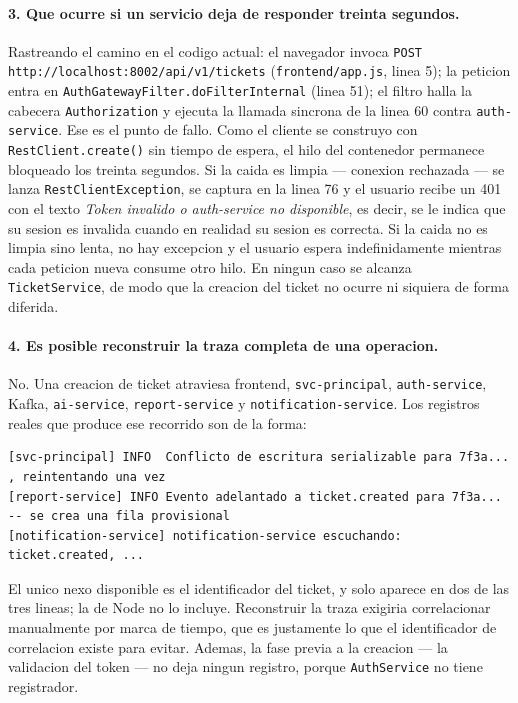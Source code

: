 \documentclass[10pt,a4paper]{article}
\begin{document}
\paragraph{3. Que ocurre si un servicio deja de responder treinta segundos.}
Rastreando el camino en el codigo actual: el navegador invoca
\texttt{POST http://localhost:8002/api/v1/tickets} (\texttt{frontend/app.js}, linea 5); la
peticion entra en \texttt{AuthGatewayFilter.doFilterInternal} (linea 51); el filtro halla la
cabecera \texttt{Authorization} y ejecuta la llamada sincrona de la linea 60 contra
\texttt{auth-service}. Ese es el punto de fallo. Como el cliente se construyo con
\texttt{RestClient.create()} sin tiempo de espera, el hilo del contenedor permanece
bloqueado los treinta segundos. Si la caida es limpia --- conexion rechazada --- se lanza
\texttt{RestClientException}, se captura en la linea 76 y el usuario recibe un 401 con el
texto \emph{Token invalido o auth-service no disponible}, es decir, se le indica que su
sesion es invalida cuando en realidad su sesion es correcta. Si la caida no es limpia sino
lenta, no hay excepcion y el usuario espera indefinidamente mientras cada peticion nueva
consume otro hilo. En ningun caso se alcanza \texttt{TicketService}, de modo que la creacion
del ticket no ocurre ni siquiera de forma diferida.

\paragraph{4. Es posible reconstruir la traza completa de una operacion.}
No. Una creacion de ticket atraviesa frontend, \texttt{svc-principal},
\texttt{auth-service}, Kafka, \texttt{ai-service}, \texttt{report-service} y
\texttt{notification-service}. Los registros reales que produce ese recorrido son de la
forma:

\begin{lstlisting}[numbers=none,caption={Salida representativa de tres servicios ante una misma operacion}]
[svc-principal] INFO  Conflicto de escritura serializable para 7f3a... , reintentando una vez
[report-service] INFO Evento adelantado a ticket.created para 7f3a... -- se crea una fila provisional
[notification-service] notification-service escuchando: ticket.created, ...
\end{lstlisting}

El unico nexo disponible es el identificador del ticket, y solo aparece en dos de las tres
lineas; la de Node no lo incluye. Reconstruir la traza exigiria correlacionar manualmente
por marca de tiempo, que es justamente lo que el identificador de correlacion existe para
evitar. Ademas, la fase previa a la creacion --- la validacion del token --- no deja ningun
registro, porque \texttt{AuthService} no tiene registrador.
\end{document}
